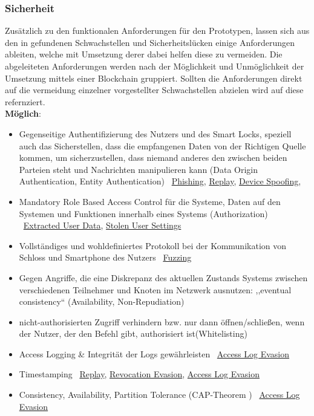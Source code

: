 \subsubsection{Sicherheit}
\label{sec:prototype_sec}
    Zusätzlich zu den funktionalen Anforderungen für den Prototypen, lassen sich aus den in  gefundenen Schwachstellen und Sicherheitslücken einige Anforderungen ableiten, welche mit Umsetzung derer dabei helfen diese zu vermeiden.
    Die abgeleiteten Anforderungen werden nach der Möglichkeit und Unmöglichkeit der Umsetzung mittels einer Blockchain gruppiert.
    Sollten die Anforderungen direkt auf die vermeidung einzelner vorgestellter Schwachstellen abzielen wird auf diese refernziert.\bigskip\\
    \noindent \textbf{Möglich}:
    \begin{itemize}
        \item Gegenseitige Authentifizierung des Nutzers und des Smart Locks, speziell auch das Sicherstellen, dass die empfangenen Daten von der Richtigen Quelle kommen, um sicherzustellen, dass niemand anderes den zwischen beiden Parteien steht und Nachrichten manipulieren kann (Data Origin Authentication, Entity Authentication) \textrightarrow\ \hyperref[vuln:phishing]{Phishing}, \hyperref[vuln:replay]{Replay}, \hyperref[vuln:spoofing]{Device Spoofing}, 
        \item Mandatory Role Based Access Control für die Systeme, Daten auf den Systemen und Funktionen innerhalb eines Systems (Authorization) \cite{Miessler2015} \textrightarrow\ \hyperref[vuln:userdata]{Extracted User Data}, \hyperref[vuln:usersettings]{Stolen User Settings}
        \item Vollständiges und wohldefiniertes Protokoll bei der Kommunikation von Schloss und Smartphone des Nutzers \textrightarrow\ \hyperref[vuln:fuzzing]{Fuzzing}
        \item Gegen Angriffe, die eine Diskrepanz des aktuellen Zustands Systems zwischen verschiedenen Teilnehmer und Knoten im Netzwerk ausnutzen: \textrightarrow ,,eventual consistency`` (Availability, Non-Repudiation)\cite{Ho2016}
        \item nicht-authorisierten Zugriff verhindern bzw. nur dann öffnen/schließen, wenn der Nutzer, der den Befehl gibt, authorisiert ist(Whitelisting) \cite{Ho2016}
        \item Access Logging \& Integrität der Logs gewährleisten \textrightarrow\ \hyperref[vuln:accesslogevasion]{Access Log Evasion}
        \item Timestamping \textrightarrow\ \hyperref[vuln:replay]{Replay}, \hyperref[vuln:revocationevasion]{Revocation Evasion}, \hyperref[vuln:accesslogevasion]{Access Log Evasion}
        \item Consistency, Availability, Partition Tolerance (CAP-Theorem \cite{Brewer2012}) \textrightarrow\ \hyperref[vuln:accesslogevasion]{Access Log Evasion}
    \end{itemize}
